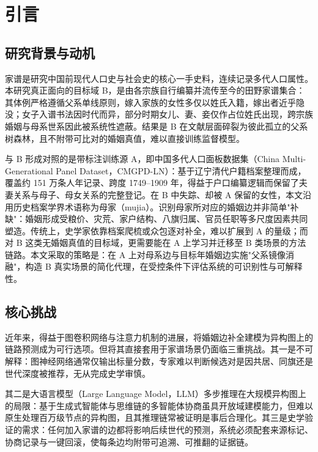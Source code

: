 \chapter{引言}\label{chap:intro}

\section{研究背景与动机}\label{sec:bg}

家谱是研究中国前现代人口史与社会史的核心一手史料，连续记录多代人口属性\citep{zhao2001chinese}。本研究真正面向的目标域 B，是由各宗族自行编纂并流传至今的田野家谱集合：其体例严格遵循父系单线原则，嫁入家族的女性多仅以姓氏入籍，嫁出者近乎隐没；女子入谱书法因时代而异，部分时期女儿、妻、妾仅作占位姓氏出现，跨宗族婚姻与母系世系因此被系统性遮蔽\citep{yan2009nuzi,calderon2025analysing}。结果是 B 在文献层面碎裂为彼此孤立的父系树森林，且不附带可比对的婚姻真值，难以直接训练监督模型。

与 B 形成对照的是带标注训练源 A，即中国多代人口面板数据集（China Multi-Generational Panel Dataset，CMGPD-LN）\citep{campbell2011data}：基于辽宁清代户籍档案整理而成，覆盖约 151 万条人年记录、跨度 1749--1909 年，得益于户口编纂逻辑而保留了夫妻关系与母子、母女关系的完整登记。在 B 中失踪、却被 A 保留的女性，本文沿用历史档案学界术语称为母家（mujia）\citep{zhao2001chinese}。识别母家所对应的婚姻边并非简单"补缺"：婚姻形成受粮价、灾荒、家户结构、八旗归属、官员任职等多尺度因素共同塑造\citep{shiue2022marriage,batyra2023union}。传统上，史学家依靠档案爬梳\citep{duff2003list}或众包\citep{shan2025reexamining}逐对补全，难以扩展到 A 的量级；而对 B 这类无婚姻真值的目标域，更需要能在 A 上学习并迁移至 B 类场景的方法链路。本文采取的策略是：在 A 上对母系边与目标年婚姻边实施"父系镜像消融"，构造 B 真实场景的简化代理，在受控条件下评估系统的可识别性与可解释性。

\section{核心挑战}\label{sec:challenge}

近年来，得益于图卷积网络\citep{kipf2016gcn}与注意力机制\citep{vaswani2017attention}的进展，将婚姻边补全建模为异构图上的链路预测成为可行选项\citep{hu2020hgt,zhang2018seal}。但将其直接套用于家谱场景仍面临三重挑战。其一是不可解释：图神经网络通常仅输出标量分数，专家难以判断候选对是因共居、同旗还是世代深度被推荐，无从完成史学审慎\citep{calderon2025analysing}。

其二是大语言模型（Large Language Model，LLM）多步推理在大规模异构图上的局限：基于生成式智能体\citep{park2023generative}与思维链\citep{wei2022cot}的多智能体协商\citep{liang2023llm}虽具开放域建模能力，但难以原生处理百万级节点的异构图，且其推理链常被证明是事后合理化\citep{turpin2023faithfulness}。其三是史学验证的需求：任何加入家谱的边都将影响后续世代的预测，系统必须配套来源标记、协商记录与一键回滚，使每条边均附带可追溯、可推翻的证据链。

